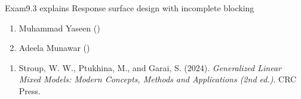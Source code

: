 \documentclass[a4paper]{book}
\begin{document}
%
\begin{Description}
Exam9.3 explains Response surface design with incomplete blocking
\end{Description}
%
\begin{Author}
\begin{enumerate}

\item{}  Muhammad Yaseen ()
\item{} Adeela Munawar ()

\end{enumerate}

\end{Author}
%
\begin{References}
\begin{enumerate}

\item{} Stroup, W. W., Ptukhina, M., and Garai, S. (2024).
\emph{Generalized Linear Mixed Models: Modern Concepts, Methods and Applications (2nd ed.)}.
CRC Press.

\end{enumerate}

\end{References}
%
\begin{SeeAlso}
\end{SeeAlso}
%
\end{document}
